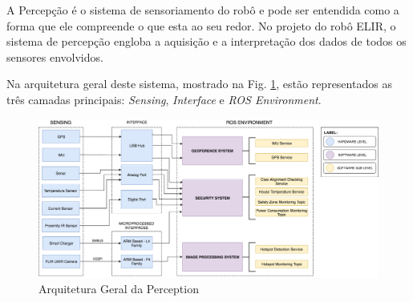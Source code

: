 %
%
%
%
%
%

A Percepção é o sistema de sensoriamento do robô e pode ser entendida como a forma que ele compreende o que esta ao seu redor. No projeto do robô ELIR, o sistema de percepção engloba a aquisição e a interpretação dos dados de todos os sensores envolvidos.

Na arquitetura geral deste sistema, mostrado na Fig. \ref{arqgeral}, estão representados as três camadas principais: \textit{Sensing}, \textit{Interface} e \textit{ROS Environment}.

\begin{figure}[!ht]
\centering
\includegraphics[width=15cm]{Figures/ArquiteturaPerceptionv2.png}
\caption{Arquitetura Geral da Perception}\label{arqgeral}
\end{figure}

